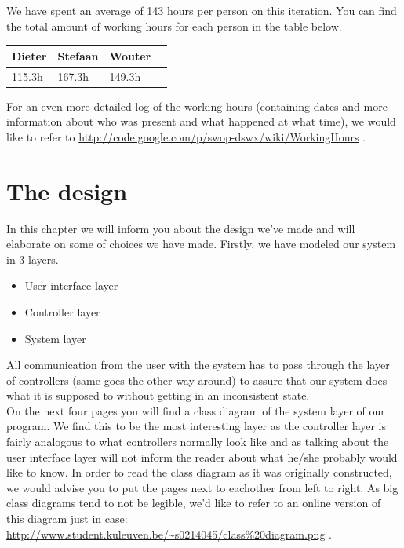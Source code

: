 \documentclass[11pt]{article}
\begin{document}
We have spent an average of 143 hours per person on this iteration. You can find the total amount of working hours for each person in the table below.
\begin{center}
    \begin{tabular}{ | l | l | l | p{100mm} |}
    \hline
    Dieter & Stefaan & Wouter\\ \hline
    115.3h & 167.3h & 149.3h\\
    \hline
    \end{tabular}
\end{center}
For an even more detailed log of the working hours (containing dates and more information about who was present and what happened at what time), we would like to refer to \url{http://code.google.com/p/swop-dswx/wiki/WorkingHours} .

\section{The design}
In this chapter we will inform you about the design we've made and will elaborate on some of choices we have made. Firstly, we have modeled our system in 3 layers. 
\begin{itemize}
\item{User interface layer}
\item{Controller layer}
\item{System layer}
\end{itemize}
All communication from the user with the system has to pass through the layer of controllers (same goes the other way around) to assure that our system does what it is supposed to without getting in an inconsistent state.
\\On the next four pages you will find a class diagram of the system layer of our program. We find this to be the most interesting layer as the controller layer is fairly analogous to what controllers normally look like and as talking about the user interface layer will not inform the reader about what he/she probably would like to know. In order to read the class diagram as it was originally constructed, we would advise you to put the pages next to eachother from left to right. As big class diagrams tend to not be legible, we'd like to refer to an online version of this diagram just in case: \url{http://www.student.kuleuven.be/~s0214045/class%20diagram.png} .\\
\end{document}
